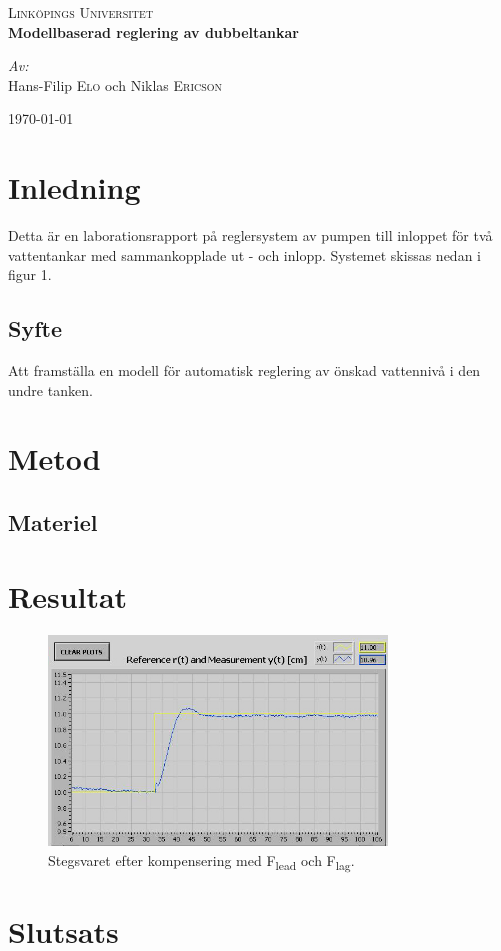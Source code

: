 \documentclass{article}
\begin{document}
\begin{titlepage}
\begin{center}


\textsc{\LARGE Link{\"o}pings Universitet}\\[1.5cm]


{ \huge \bfseries Modellbaserad reglering av dubbeltankar \\[0.4cm] }

\large
\emph{Av:}\\
Hans-Filip \textsc{Elo} och Niklas \textsc{Ericson}

\vfill

{\large \today}

\end{center}
\end{titlepage}


\section{Inledning}
Detta {\"a}r en laborationsrapport p{\aa} reglersystem av pumpen till inloppet för tv{\aa} vattentankar med sammankopplade ut - och inlopp. Systemet skissas nedan i figur 1. 

\subsection{Syfte}
Att framst{\"a}lla en modell för automatisk reglering av {\"o}nskad vattenniv{\aa} i den undre tanken. 

\section{Metod}


\subsection{Materiel}

\section{Resultat}

\begin{figure}[ht!]
\centering
\includegraphics[width=90mm]{Test1_cut.jpg}
\caption{Stegsvaret efter kompensering med F\textsubscript{lead} och F\textsubscript{lag}.}
\label{overflow}
\end{figure}


\section{Slutsats}
\end{document}
